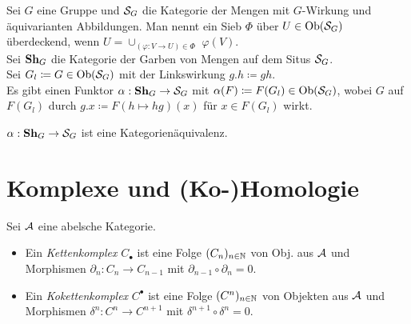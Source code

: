 \documentclass{cheat-sheet}
\newcommand{\CC}[1]{{#1}_{\bullet}} %
\newcommand{\CCC}[1]{{#1}^{\bullet}} %
\begin{document}
\begin{bsp}
  Sei $G$ eine Gruppe und $\mathcal{S}_G$ die Kategorie der Mengen mit $G$-Wirkung und äquivarianten Abbildungen. Man nennt ein Sieb $\Phi$ über $U \in \operatorname{Ob}(\mathcal{S}_G)$ überdeckend, wenn
  $U = \cup_{(\varphi : V \to U) \in \Phi} \,\, \varphi(V)$. \\
  Sei $\mathbf{Sh}_G$ die Kategorie der Garben von Mengen auf dem Situs $\mathcal{S}_G$. \\
  Sei $G_l \coloneqq G \in \operatorname{Ob}(\mathcal{S}_G)$ mit der Linkswirkung $g.h \coloneqq gh$. \\
  Es gibt einen Funktor $\alpha : \mathbf{Sh}_G \to \mathcal{S}_G$ mit $\alpha(F) \coloneqq F(G_l) \in \operatorname{Ob}(\mathcal{S}_G)$, wobei $G$ auf $F(G_l)$ durch $g.x \coloneqq F(h \mapsto hg)(x)$ für $x \in F(G_l)$ wirkt.
\end{bsp}

\begin{prop}
  $\alpha : \mathbf{Sh}_G \to \mathcal{S}_G$ ist eine Kategorienäquivalenz.
\end{prop}




\section{Komplexe und (Ko-)Homologie}

Sei $\mathcal{A}$ eine abelsche Kategorie.

\begin{defn}
  \begin{itemize}
    \item Ein \emph{Kettenkomplex} $\CC{C}$ ist eine Folge $(C_n)_{n \in \mathbb{N}}$ von Obj. aus $\mathcal{A}$ und Morphismen $\partial_n : C_n \to C_{n-1}$ mit $\partial_{n-1} \circ \partial_n = 0$.
    \item Ein \emph{Kokettenkomplex} $\CCC{C}$ ist eine Folge $(C^n)_{n \in \mathbb{N}}$ von Objekten aus $\mathcal{A}$ und Morphismen $\delta^n : C^n \to C^{n+1}$ mit $\delta^{n+1} \circ \delta^n = 0$.
  \end{itemize}
\end{defn}
\end{document}
